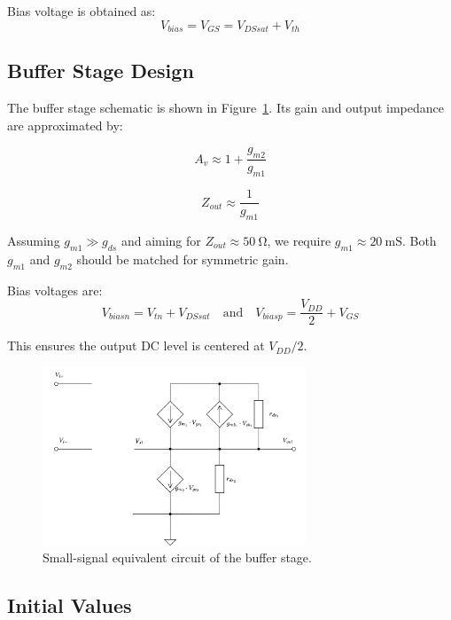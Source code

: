 Bias voltage is obtained as:
\begin{equation}
    V_{bias} = V_{GS} = V_{DSsat} + V_{th}
    \label{eq:V_bias_CS}
\end{equation}

\subsection{Buffer Stage Design}

The buffer stage schematic is shown in Figure~\ref{fig:Buff_SmallSignal}. Its gain and output impedance are approximated by:

\begin{equation}
    A_v \approx 1 + \frac{g_{m2}}{g_{m1}}
    \label{eq:buff_Gain}
\end{equation}

\begin{equation}
    Z_{out} \approx \frac{1}{g_{m1}} 
    \label{eq:buff_zout}
\end{equation}

Assuming $g_{m1} \gg g_{ds}$ and aiming for $Z_{out} \approx \SI{50}{\ohm}$, we require $g_{m1} \approx \SI{20}{\milli\siemens}$. Both $g_{m1}$ and $g_{m2}$ should be matched for symmetric gain.

Bias voltages are:
\[
V_{biasn} = V_{tn} + V_{DSsat}
\quad\text{and}\quad
V_{biasp} = \frac{V_{DD}}{2} + V_{GS}
\]

This ensures the output DC level is centered at $V_{DD}/2$.

\begin{figure}[H]
    \centering
    \includegraphics[width=0.7\textwidth]{Images/BufferSmallSignal.png}
    \caption{Small-signal equivalent circuit of the buffer stage.}
    \label{fig:Buff_SmallSignal}
\end{figure}

\subsection{Initial Values}

